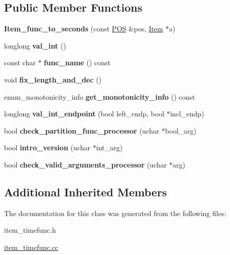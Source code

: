 \subsection*{Public Member Functions}
\begin{DoxyCompactItemize}
\item 
\mbox{\label{classItem__func__to__seconds_a4d109461ec57a1e2e2dffe49decafa61}} 
{\bfseries Item\+\_\+func\+\_\+to\+\_\+seconds} (const \mbox{\hyperlink{structYYLTYPE}{P\+OS}} \&pos, \mbox{\hyperlink{classItem}{Item}} $\ast$a)
\item 
\mbox{\label{classItem__func__to__seconds_a856d892efc02934e23f6d29c4fff170e}} 
longlong {\bfseries val\+\_\+int} ()
\item 
\mbox{\label{classItem__func__to__seconds_a82312870af635a2c3bb0d8ae7728e2fb}} 
const char $\ast$ {\bfseries func\+\_\+name} () const
\item 
\mbox{\label{classItem__func__to__seconds_a2c1fd0028c8f37813723b3406ce8736b}} 
void {\bfseries fix\+\_\+length\+\_\+and\+\_\+dec} ()
\item 
\mbox{\label{classItem__func__to__seconds_af0291a19d9ec4861752e885774a9e62f}} 
enum\+\_\+monotonicity\+\_\+info {\bfseries get\+\_\+monotonicity\+\_\+info} () const
\item 
\mbox{\label{classItem__func__to__seconds_a2820e1855c6f5a761a60436a5d52ca42}} 
longlong {\bfseries val\+\_\+int\+\_\+endpoint} (bool left\+\_\+endp, bool $\ast$incl\+\_\+endp)
\item 
\mbox{\label{classItem__func__to__seconds_ab05370f9e665f3396aaf3420a4077182}} 
bool {\bfseries check\+\_\+partition\+\_\+func\+\_\+processor} (uchar $\ast$bool\+\_\+arg)
\item 
\mbox{\label{classItem__func__to__seconds_aa855552485911c7d326c3ddd4bc1c815}} 
bool {\bfseries intro\+\_\+version} (uchar $\ast$int\+\_\+arg)
\item 
\mbox{\label{classItem__func__to__seconds_a8577bf4ef54250244ad8cc075e90c2d9}} 
bool {\bfseries check\+\_\+valid\+\_\+arguments\+\_\+processor} (uchar $\ast$arg)
\end{DoxyCompactItemize}
\subsection*{Additional Inherited Members}


The documentation for this class was generated from the following files\+:\begin{DoxyCompactItemize}
\item 
item\+\_\+timefunc.\+h\item 
\mbox{\hyperlink{item__timefunc_8cc}{item\+\_\+timefunc.\+cc}}\end{DoxyCompactItemize}
